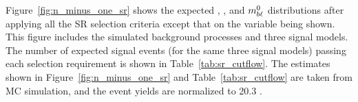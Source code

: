 % 

Figure~\ref{fig:n_minus_one_sr} shows the expected \HT, \MBLASYM, and $m_{b\ell}^0$
distributions after applying all the SR selection criteria except that on the
variable being shown.
This figure includes the simulated background processes and three signal models.
The number of expected signal events (for the same three signal models)
passing each selection requirement is shown in Table~\ref{tab:sr_cutflow}.
The estimates shown in Figure~\ref{fig:n_minus_one_sr} and
Table~\ref{tab:sr_cutflow} are taken from MC simulation, and the event
yields are normalized to 20.3 \ifb.

